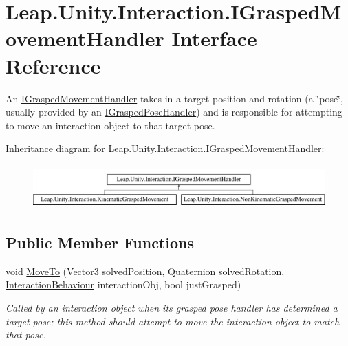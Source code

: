 \hypertarget{interface_leap_1_1_unity_1_1_interaction_1_1_i_grasped_movement_handler}{}\section{Leap.\+Unity.\+Interaction.\+I\+Grasped\+Movement\+Handler Interface Reference}
\label{interface_leap_1_1_unity_1_1_interaction_1_1_i_grasped_movement_handler}


An \mbox{\hyperlink{interface_leap_1_1_unity_1_1_interaction_1_1_i_grasped_movement_handler}{I\+Grasped\+Movement\+Handler}} takes in a target position and rotation (a \char`\"{}pose\char`\"{}, usually provided by an \mbox{\hyperlink{interface_leap_1_1_unity_1_1_interaction_1_1_i_grasped_pose_handler}{I\+Grasped\+Pose\+Handler}}) and is responsible for attempting to move an interaction object to that target pose.  


Inheritance diagram for Leap.\+Unity.\+Interaction.\+I\+Grasped\+Movement\+Handler\+:\begin{figure}[H]
\begin{center}
\leavevmode
\includegraphics[height=1.696970cm]{interface_leap_1_1_unity_1_1_interaction_1_1_i_grasped_movement_handler}
\end{center}
\end{figure}
\subsection*{Public Member Functions}
\begin{DoxyCompactItemize}
\item 
void \mbox{\hyperlink{interface_leap_1_1_unity_1_1_interaction_1_1_i_grasped_movement_handler_a49da4845ba5c20aa1ff075745b634c78}{Move\+To}} (Vector3 solved\+Position, Quaternion solved\+Rotation, \mbox{\hyperlink{class_leap_1_1_unity_1_1_interaction_1_1_interaction_behaviour}{Interaction\+Behaviour}} interaction\+Obj, bool just\+Grasped)
\begin{DoxyCompactList}\small\item\em Called by an interaction object when its grasped pose handler has determined a target pose; this method should attempt to move the interaction object to match that pose. \end{DoxyCompactList}\end{DoxyCompactItemize}



